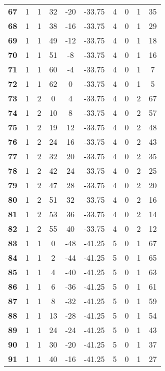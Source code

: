 \documentclass[12pt,letterpaper, onecolumn]{exam}
\begin{document}
\begin{longtable}{cccccccccc}
    \textbf{67} & 1 & 1 & 32 & -20 & -33.75 & 4 & 0 & 1 & 35 \\ 
    \textbf{68} & 1 & 1 & 38 & -16 & -33.75 & 4 & 0 & 1 & 29 \\ 
    \textbf{69} & 1 & 1 & 49 & -12 & -33.75 & 4 & 0 & 1 & 18 \\ 
    \textbf{70} & 1 & 1 & 51 & -8 & -33.75 & 4 & 0 & 1 & 16 \\ 
    \textbf{71} & 1 & 1 & 60 & -4 & -33.75 & 4 & 0 & 1 & 7 \\ 
    \textbf{72} & 1 & 1 & 62 & 0 & -33.75 & 4 & 0 & 1 & 5 \\ 
    \textbf{73} & 1 & 2 & 0 & 4 & -33.75 & 4 & 0 & 2 & 67 \\     \hline
    \textbf{74} & 1 & 2 & 10 & 8 & -33.75 & 4 & 0 & 2 & 57 \\ 
    \textbf{75} & 1 & 2 & 19 & 12 & -33.75 & 4 & 0 & 2 & 48 \\ 
    \textbf{76} & 1 & 2 & 24 & 16 & -33.75 & 4 & 0 & 2 & 43 \\ 
    \textbf{77} & 1 & 2 & 32 & 20 & -33.75 & 4 & 0 & 2 & 35 \\ 
    \textbf{78} & 1 & 2 & 42 & 24 & -33.75 & 4 & 0 & 2 & 25 \\ 
    \textbf{79} & 1 & 2 & 47 & 28 & -33.75 & 4 & 0 & 2 & 20 \\ 
    \textbf{80} & 1 & 2 & 51 & 32 & -33.75 & 4 & 0 & 2 & 16 \\ 
    \textbf{81} & 1 & 2 & 53 & 36 & -33.75 & 4 & 0 & 2 & 14 \\ 
    \textbf{82} & 1 & 2 & 55 & 40 & -33.75 & 4 & 0 & 2 & 12 \\ 
    \textbf{83} & 1 & 1 & 0 & -48 & -41.25 & 5 & 0 & 1 & 67 \\ 
    \textbf{84} & 1 & 1 & 2 & -44 & -41.25 & 5 & 0 & 1 & 65 \\ 
    \textbf{85} & 1 & 1 & 4 & -40 & -41.25 & 5 & 0 & 1 & 63 \\ 
    \textbf{86} & 1 & 1 & 6 & -36 & -41.25 & 5 & 0 & 1 & 61 \\ 
    \textbf{87} & 1 & 1 & 8 & -32 & -41.25 & 5 & 0 & 1 & 59 \\ 
    \textbf{88} & 1 & 1 & 13 & -28 & -41.25 & 5 & 0 & 1 & 54 \\ 
    \textbf{89} & 1 & 1 & 24 & -24 & -41.25 & 5 & 0 & 1 & 43 \\ 
    \textbf{90} & 1 & 1 & 30 & -20 & -41.25 & 5 & 0 & 1 & 37 \\ 
    \textbf{91} & 1 & 1 & 40 & -16 & -41.25 & 5 & 0 & 1 & 27 \\ 

\end{longtable}
\end{document}
